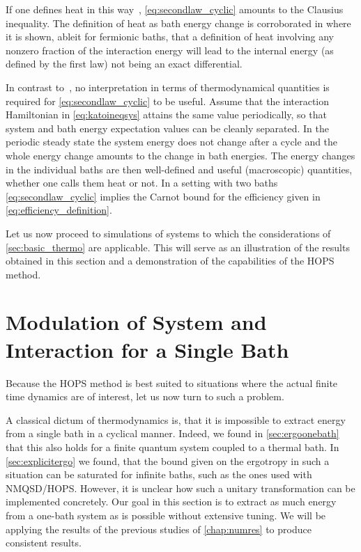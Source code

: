 If one defines heat in this
way~\cite{Kato2016Dec,Riechers2021Apr,Strasberg2021Aug},
\cref{eq:secondlaw_cyclic} amounts to the Clausius inequality. The
definition of heat as bath energy change is corroborated
in  where it is shown, ableit for fermionic
baths, that a definition of heat involving any nonzero fraction of the
interaction energy will lead to the internal energy (as defined by the
first law) not being an exact differential.

In contrast to~\cite{Strasberg2021Aug}, no interpretation in terms of
thermodynamical quantities is required for \cref{eq:secondlaw_cyclic}
to be useful.  Assume that the interaction Hamiltonian in
\cref{eq:katoineqsys} attains the same value periodically, so that
system and bath energy expectation values can be cleanly separated. In
the periodic steady state the system energy does not change after a
cycle and the whole energy change amounts to the change in bath
energies. The energy changes in the individual baths are then
well-defined and useful (macroscopic) quantities, whether one calls
them heat or not.  In a setting with two baths
\cref{eq:secondlaw_cyclic} implies the Carnot bound for the efficiency
given in \cref{eq:efficiency_definition}.

Let us now proceed to simulations of systems to which the
considerations of \cref{sec:basic_thermo} are applicable. This will
serve as an illustration of the results obtained in this section and a
demonstration of the capabilities of the HOPS method.

\section{Modulation of System and Interaction for a Single Bath}%
\label{sec:singlemod}
Because the HOPS method is best suited to situations where the actual
finite time dynamics are of interest, let us now turn to such a
problem.

A classical dictum of thermodynamics is, that it is impossible to
extract energy from a single bath in a cyclical manner. Indeed, we
found in \cref{sec:ergoonebath} that this also holds for a finite
quantum system coupled to a thermal bath. In \cref{sec:explicitergo}
we found, that the bound given on the ergotropy in such a situation
can be saturated for infinite baths, such as the ones used with
NMQSD/HOPS. However, it is unclear how such a unitary transformation
can be implemented concretely. Our goal in this section is to extract
as much energy from a one-bath system as is possible without extensive
tuning. We will be applying the results of the previous studies of
\cref{chap:numres} to produce consistent results.


